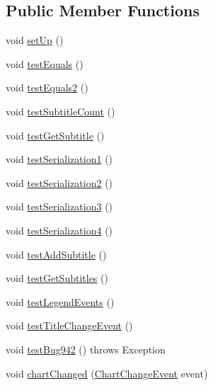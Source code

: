 \subsection*{Public Member Functions}
\begin{DoxyCompactItemize}
\item 
void \mbox{\hyperlink{classorg_1_1jfree_1_1chart_1_1_j_free_chart_test_aadf9ccaef7e3bc49f050c6ec15f2e325}{set\+Up}} ()
\item 
void \mbox{\hyperlink{classorg_1_1jfree_1_1chart_1_1_j_free_chart_test_a47926872d8b884ab2c62e98c671d4a50}{test\+Equals}} ()
\item 
void \mbox{\hyperlink{classorg_1_1jfree_1_1chart_1_1_j_free_chart_test_a02e6e60e6a73406bbbbed26727d8ca1c}{test\+Equals2}} ()
\item 
void \mbox{\hyperlink{classorg_1_1jfree_1_1chart_1_1_j_free_chart_test_ade1fce7cdb6fe7df4d1d4121b10fea2c}{test\+Subtitle\+Count}} ()
\item 
void \mbox{\hyperlink{classorg_1_1jfree_1_1chart_1_1_j_free_chart_test_a153c14999c2ad5c1b56911c3c215978d}{test\+Get\+Subtitle}} ()
\item 
void \mbox{\hyperlink{classorg_1_1jfree_1_1chart_1_1_j_free_chart_test_a49932e7810975479ed984368f8eee3b5}{test\+Serialization1}} ()
\item 
void \mbox{\hyperlink{classorg_1_1jfree_1_1chart_1_1_j_free_chart_test_a00f86f28ba305c0959580254090f063f}{test\+Serialization2}} ()
\item 
void \mbox{\hyperlink{classorg_1_1jfree_1_1chart_1_1_j_free_chart_test_a26a001fc33af50e8efe6d9d32fd15d37}{test\+Serialization3}} ()
\item 
void \mbox{\hyperlink{classorg_1_1jfree_1_1chart_1_1_j_free_chart_test_af241530825c4278608a4673060b1f27f}{test\+Serialization4}} ()
\item 
void \mbox{\hyperlink{classorg_1_1jfree_1_1chart_1_1_j_free_chart_test_a7731d11301fd92610e0c3141b1294065}{test\+Add\+Subtitle}} ()
\item 
void \mbox{\hyperlink{classorg_1_1jfree_1_1chart_1_1_j_free_chart_test_a73e7ae0b0c1e40c10af1801664eb9a3f}{test\+Get\+Subtitles}} ()
\item 
void \mbox{\hyperlink{classorg_1_1jfree_1_1chart_1_1_j_free_chart_test_abd468e1930bc9fd09ebcc149268af15b}{test\+Legend\+Events}} ()
\item 
void \mbox{\hyperlink{classorg_1_1jfree_1_1chart_1_1_j_free_chart_test_af3e2f90f249efb3cfb3c33a6248e78c9}{test\+Title\+Change\+Event}} ()
\item 
void \mbox{\hyperlink{classorg_1_1jfree_1_1chart_1_1_j_free_chart_test_a03533a25957573fcbd4cad0705c54614}{test\+Bug942}} ()  throws Exception 
\item 
void \mbox{\hyperlink{classorg_1_1jfree_1_1chart_1_1_j_free_chart_test_a97b21a47b203de35fe1496bf28fdfc75}{chart\+Changed}} (\mbox{\hyperlink{classorg_1_1jfree_1_1chart_1_1event_1_1_chart_change_event}{Chart\+Change\+Event}} event)
\end{DoxyCompactItemize}


